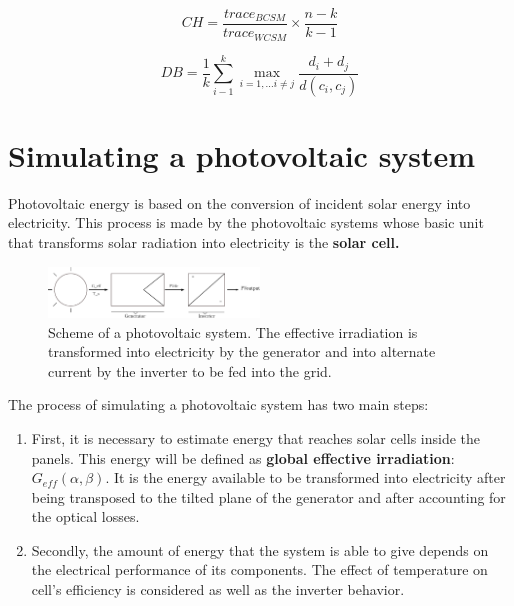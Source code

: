 \begin{equation}\label{eq:calinski}
    CH =\frac{trace_{BCSM}}{trace_{WCSM}}\times\frac{n-k}{k-1}
\end{equation}

\begin{equation}\label{eq:davies}
    DB =\frac{1}{k}\sum_{i-1}^{k}\max_{i=1,...i\neq{j}}{\frac{d_{i}+d_{j}}{d(c_i,c_j)}}
\end{equation}

\section{Simulating a photovoltaic system}

Photovoltaic energy is based on the conversion of incident solar energy into electricity. This process is made by the photovoltaic systems whose basic unit that transforms solar radiation into electricity is the \textbf{solar cell.}\\

\begin{figure}
\centering
\includegraphics[width=0.5\textwidth]{figs/pvsistem.pdf}
\caption[Scheme of a photovoltaic system]{Scheme of a photovoltaic system. The effective irradiation is transformed into electricity by the generator and into alternate current by the inverter to be fed into the grid.}
\label{fig:ecad}
\end{figure}

The process of simulating a photovoltaic system has two main steps:

\begin{enumerate}
\item First, it is necessary to estimate energy that reaches solar cells inside the panels. This energy will be defined as \textbf{global effective irradiation}: $G_{eff}(\alpha, \beta)$. It is the energy available to be transformed into electricity after being transposed to the tilted plane of the generator and after accounting for the optical losses.
  \item Secondly, the amount of energy that the system is able to give depends on the electrical performance of its components. The effect of temperature on cell's efficiency is considered as well as the inverter behavior.
  \end{enumerate}
  
